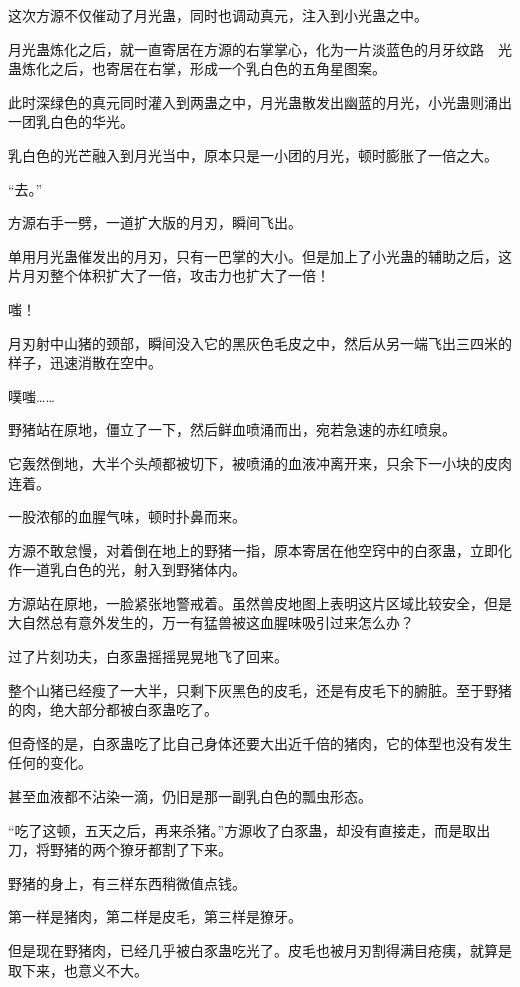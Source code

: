 \begin{this_body}
这次方源不仅催动了月光蛊，同时也调动真元，注入到小光蛊之中。

月光蛊炼化之后，就一直寄居在方源的右掌掌心，化为一片淡蓝色的月牙纹路　光蛊炼化之后，也寄居在右掌，形成一个乳白色的五角星图案。

此时深绿色的真元同时灌入到两蛊之中，月光蛊散发出幽蓝的月光，小光蛊则涌出一团乳白色的华光。

乳白色的光芒融入到月光当中，原本只是一小团的月光，顿时膨胀了一倍之大。

“去。”

方源右手一劈，一道扩大版的月刃，瞬间飞出。

单用月光蛊催发出的月刃，只有一巴掌的大小。但是加上了小光蛊的辅助之后，这片月刃整个体积扩大了一倍，攻击力也扩大了一倍！

嗤！

月刃射中山猪的颈部，瞬间没入它的黑灰色毛皮之中，然后从另一端飞出三四米的样子，迅速消散在空中。

噗嗤……

野猪站在原地，僵立了一下，然后鲜血喷涌而出，宛若急速的赤红喷泉。

它轰然倒地，大半个头颅都被切下，被喷涌的血液冲离开来，只余下一小块的皮肉连着。

一股浓郁的血腥气味，顿时扑鼻而来。

方源不敢怠慢，对着倒在地上的野猪一指，原本寄居在他空窍中的白豕蛊，立即化作一道乳白色的光，射入到野猪体内。

方源站在原地，一脸紧张地警戒着。虽然兽皮地图上表明这片区域比较安全，但是大自然总有意外发生的，万一有猛兽被这血腥味吸引过来怎么办？

过了片刻功夫，白豕蛊摇摇晃晃地飞了回来。

整个山猪已经瘦了一大半，只剩下灰黑色的皮毛，还是有皮毛下的腑脏。至于野猪的肉，绝大部分都被白豕蛊吃了。

但奇怪的是，白豕蛊吃了比自己身体还要大出近千倍的猪肉，它的体型也没有发生任何的变化。

甚至血液都不沾染一滴，仍旧是那一副乳白色的瓢虫形态。

“吃了这顿，五天之后，再来杀猪。”方源收了白豕蛊，却没有直接走，而是取出刀，将野猪的两个獠牙都割了下来。

野猪的身上，有三样东西稍微值点钱。

第一样是猪肉，第二样是皮毛，第三样是獠牙。

但是现在野猪肉，已经几乎被白豕蛊吃光了。皮毛也被月刃割得满目疮痍，就算是取下来，也意义不大。


\end{this_body}
